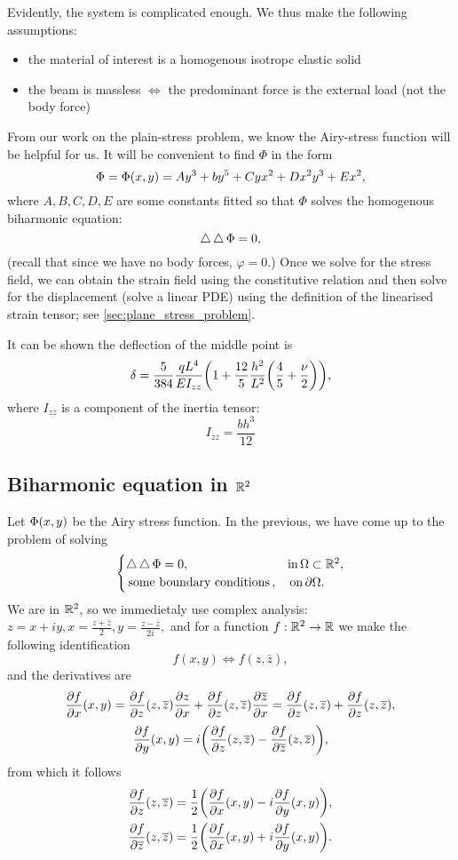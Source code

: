 \documentclass[reqno, a4paper]{article}
\begin{document}
Evidently, the system is complicated enough. We thus make the following assumptions:

\begin{itemize}
	\item the material of interest is a homogenous isotropc elastic solid
	\item the beam is massless $\Leftrightarrow$ the predominant force is the external load (not the body force)
\end{itemize}

From our work on the plain-stress problem, we know the Airy-stress function will be helpful for us. It will be convenient to find $\Phi$ in the form
\[
	\Phi = \Phi\qty(x,y) = A y^{3} + b y^5 + C yx^{2}+ D x^{2}y^{3}+Ex^{2},
\]
where $A,B,C,D,E$ are some constants fitted so that $\Phi$ solves the homogenous biharmonic equation: 
\[
	\operatorname{\bigtriangleup} \operatorname{\bigtriangleup} \Phi = 0,
\]
(recall that since we have no body forces, $\varphi = 0.$) Once we solve for the stress field, we can obtain the strain field using the constitutive relation and then solve for the displacement (solve a linear PDE) using the definition of the linearised strain tensor; see \ref{sec:plane_stress_problem}.

It can be shown the deflection of the middle point is 
\[
	\delta = \frac{5}{384}\frac{qL^4}{EI_{zz}}\qty(1+\frac{12}{5}\frac{h^{2}}{L^{2}}\qty(\frac{4}{5}+\frac{\nu}{2})),
\]
where $I_{zz}$ is a component of the inertia tensor:
\[
	I_{zz} = \frac{bh^{3}}{12}
\]


\subsection{Biharmonic equation in ${\mathbb R}^2$}
\label{sec:biharmonic}

Let $\Phi\qty(x,y)$ be the Airy stress function. In the previous, we have come up to the problem of solving
\[
	\begin{cases}\operatorname{\bigtriangleup} \operatorname{\bigtriangleup} \Phi = 0, \, &\text{in} \, \Omega \subset {\mathbb R}^2,\\
	\, \text{some boundary conditions} \,, &\, \text{on} \, \partial  \Omega.\end{cases}
\]
We are in ${\mathbb R}^2$, so we immedietaly use complex analysis: $z = x+iy, x = \frac{z+\overline{z}}{2}, y = \frac{z-\overline{z}}{2i},$ and for a function $f: {\mathbb R}^2 \to {\mathbb R}$ we make the following identification
\[
	f(x,y) \Leftrightarrow f(z,\overline{z}),
\]
and the derivatives are
\[
	\pdv{f}{x}\qty(x,y) = \pdv{f}{z}\qty(z,\overline{z})\pdv{z}{x}+\pdv{f}{z}\qty(z,\overline{z})\pdv{\overline{z}}{x} = \pdv{f}{z}\qty(z,\overline{z})+\pdv{f}{z}\qty(z,\overline{z}),
\]
\[
	\pdv{f}{y}\qty(x,y) = i\qty(\pdv{f}{z}\qty(z,\overline{z})-\pdv{f}{\overline{z}}\qty(z,\overline{z})),
\]
from which it follows
\begin{align*}
	\pdv{f}{z}\qty(z,\overline{z}) &= \frac{1}{2}\qty(\pdv{f}{x}\qty(x,y)-i \pdv{f}{y}\qty(x,y)), \\
	\pdv{f}{\overline{z}}\qty(z,\overline{z}) &= \frac{1}{2}\qty(\pdv{f}{x}\qty(x,y)+i \pdv{f}{y}\qty(x,y)).
\end{align*}
\end{document}
